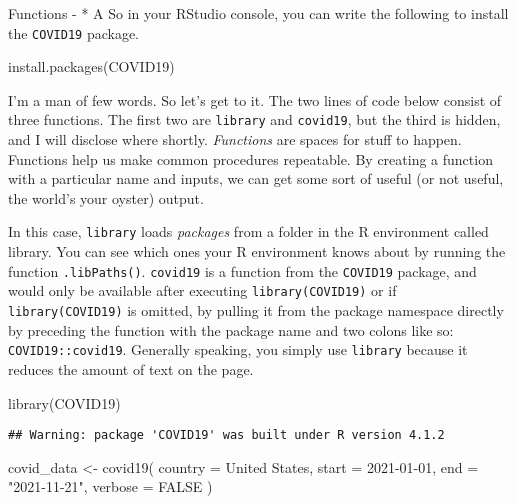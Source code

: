 \documentclass[
]{book}
\newenvironment{Shaded}{\begin{snugshade}}{\end{snugshade}}
\newcommand{\AttributeTok}[1]{\textcolor[rgb]{0.77,0.63,0.00}{#1}}
\newcommand{\ConstantTok}[1]{\textcolor[rgb]{0.00,0.00,0.00}{#1}}
\newcommand{\FunctionTok}[1]{\textcolor[rgb]{0.00,0.00,0.00}{#1}}
\newcommand{\NormalTok}[1]{#1}
\newcommand{\OtherTok}[1]{\textcolor[rgb]{0.56,0.35,0.01}{#1}}
\newcommand{\StringTok}[1]{\textcolor[rgb]{0.31,0.60,0.02}{#1}}
\begin{document}
Functions -
* A
So in your RStudio console, you can write the following to install the \texttt{COVID19} package.

\begin{Shaded}
\begin{Highlighting}[]
\FunctionTok{install.packages}\NormalTok{(}\StringTok{\textquotesingle{}COVID19\textquotesingle{}}\NormalTok{)}
\end{Highlighting}
\end{Shaded}

I'm a man of few words. So let's get to it. The two lines of code below consist of three functions. The first two are \texttt{library} and \texttt{covid19}, but the third is hidden, and I will disclose where shortly. \emph{Functions} are spaces for stuff to happen. Functions help us make common procedures repeatable. By creating a function with a particular name and inputs, we can get some sort of useful (or not useful, the world's your oyster) output.

In this case, \texttt{library} loads \emph{packages} from a folder in the R environment called library. You can see which ones your R environment knows about by running the function \texttt{.libPaths()}. \texttt{covid19} is a function from the \texttt{COVID19} package, and would only be available after executing \texttt{library(COVID19)} or if \texttt{library(COVID19)} is omitted, by pulling it from the package namespace directly by preceding the function with the package name and two colons like so: \texttt{COVID19::covid19}. Generally speaking, you simply use \texttt{library} because it reduces the amount of text on the page.

\begin{Shaded}
\begin{Highlighting}[]
\FunctionTok{library}\NormalTok{(COVID19)}
\end{Highlighting}
\end{Shaded}

\begin{verbatim}
## Warning: package 'COVID19' was built under R version 4.1.2
\end{verbatim}

\begin{Shaded}
\begin{Highlighting}[]
\NormalTok{covid\_data }\OtherTok{\textless{}{-}} \FunctionTok{covid19}\NormalTok{(}
    \AttributeTok{country =} \StringTok{\textquotesingle{}United States\textquotesingle{}}\NormalTok{, }
    \AttributeTok{start =} \StringTok{\textquotesingle{}2021{-}01{-}01\textquotesingle{}}\NormalTok{, }
    \AttributeTok{end =} \StringTok{"2021{-}11{-}21"}\NormalTok{,}
    \AttributeTok{verbose =} \ConstantTok{FALSE}
\NormalTok{)}
\end{Highlighting}
\end{Shaded}
\end{document}

